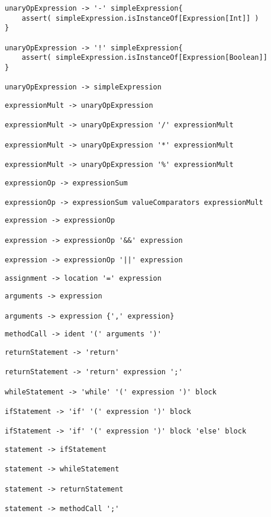 \documentclass[12pt,letterpaper]{article}
\begin{document}
\begin{lstlisting}
unaryOpExpression -> '-' simpleExpression{
	assert( simpleExpression.isInstanceOf[Expression[Int]] )
}

unaryOpExpression -> '!' simpleExpression{
	assert( simpleExpression.isInstanceOf[Expression[Boolean]]
}

unaryOpExpression -> simpleExpression
\end{lstlisting}

\begin{lstlisting}
expressionMult -> unaryOpExpression 

expressionMult -> unaryOpExpression '/' expressionMult

expressionMult -> unaryOpExpression '*' expressionMult

expressionMult -> unaryOpExpression '%' expressionMult
\end{lstlisting}

\begin{lstlisting}
expressionOp -> expressionSum 

expressionOp -> expressionSum valueComparators expressionMult
\end{lstlisting}

\begin{lstlisting}
expression -> expressionOp

expression -> expressionOp '&&' expression

expression -> expressionOp '||' expression
\end{lstlisting}

\begin{lstlisting}
assignment -> location '=' expression
\end{lstlisting}

\begin{lstlisting}
arguments -> expression

arguments -> expression {',' expression}
\end{lstlisting}

\begin{lstlisting}
methodCall -> ident '(' arguments ')'
\end{lstlisting}

\begin{lstlisting}
returnStatement -> 'return'

returnStatement -> 'return' expression ';'

whileStatement -> 'while' '(' expression ')' block

ifStatement -> 'if' '(' expression ')' block 

ifStatement -> 'if' '(' expression ')' block 'else' block
\end{lstlisting}

\begin{lstlisting}
statement -> ifStatement

statement -> whileStatement

statement -> returnStatement

statement -> methodCall ';'
\end{lstlisting}
\end{document}
